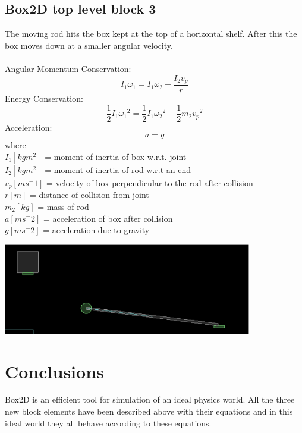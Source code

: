 \documentclass[english, 11pt]{article}
\begin{document}
\subsection{Box2D top level block 3} 
The moving rod hits the box kept at the top of a horizontal shelf. After this the box moves down at a smaller angular velocity.\\
\\
Angular Momentum Conservation:
\begin{equation}
{I_1}{{\omega}_1} = {I_1}{{\omega}_2} + \frac{{I_2}{v_p}}{r}
\end{equation}
Energy Conservation:
\begin{equation}
\frac{1}{2} I_1 {{\omega}_1}^2 = \frac{1}{2} I_1 {{\omega}_2}^2 + \frac{1}{2} m_2 {v_p}^2
\end{equation}
Acceleration:
\begin{equation}
a = g
\end{equation}
where\\
$I_1[{kg}{m^2}]$ = moment of inertia of box w.r.t. joint\\
$I_2[{kg}{m^2}]$ = moment of inertia of rod w.r.t an end\\
$v_p[{m}{s^-1}]$ = velocity of box perpendicular to the rod after collision\\
$r[{m}]$ = distance of collision from joint\\
$m_2[{kg}]$ = mass of rod\\
$a[{m}{s^-2}]$ = acceleration of box after collision\\
$g[{m}{s^-2}]$ = acceleration due to gravity\\
	\begin{center}
		\includegraphics[height=150px]{dominos3}
	\end{center}

\section{Conclusions} %
Box2D is an efficient tool for simulation of an ideal physics world.
All the three new block elements have been described above with their equations and in this ideal world they all behave according to these equations.


\end{document}
